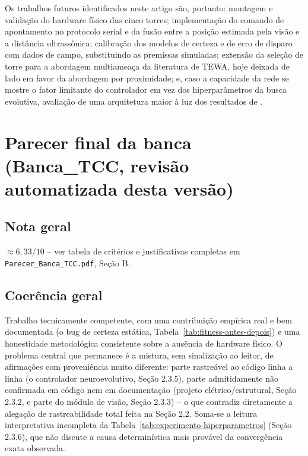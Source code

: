 \documentclass[12pt,a4paper]{article}
\begin{document}
Os trabalhos futuros identificados neste artigo são, portanto: montagem e validação do hardware
físico das cinco torres; implementação do comando de apontamento no protocolo serial e da fusão
entre a posição estimada pela visão e a distância ultrassônica; calibração dos modelos de certeza e
de erro de disparo com dados de campo, substituindo as premissas simuladas; extensão da seleção de
torre para a abordagem multiameaça da literatura de TEWA, hoje deixada de lado em favor da
abordagem por proximidade; e, caso a capacidade da rede se mostre o fator limitante do controlador
em vez dos hiperparâmetros da busca evolutiva, avaliação de uma arquitetura maior à luz dos
resultados de .

\clearpage
\section*{Parecer final da banca (Banca\_TCC, revisão automatizada desta versão)}

\subsection*{Nota geral}

\textbf{$\approx 6{,}33/10$} -- ver tabela de critérios e justificativas completas em
\texttt{Parecer\_Banca\_TCC.pdf}, Seção B.

\subsection*{Coerência geral}

Trabalho tecnicamente competente, com uma contribuição empírica real e bem documentada (o bug de
certeza estática, Tabela~\ref{tab:fitness-antes-depois}) e uma honestidade metodológica consistente
sobre a ausência de hardware físico. O problema central que permanece é a mistura, sem sinalização
ao leitor, de afirmações com proveniência muito diferente: parte rastreável ao código linha a linha
(o controlador neuroevolutivo, Seção 2.3.5), parte admitidamente não confirmada em código nem em
documentação (projeto elétrico/estrutural, Seção 2.3.2, e parte do módulo de visão, Seção 2.3.3) --
o que contradiz diretamente a alegação de rastreabilidade total feita na Seção 2.2. Soma-se a leitura
interpretativa incompleta da Tabela~\ref{tab:experimento-hiperparametros} (Seção 2.3.6), que não
discute a causa determinística mais provável da convergência exata observada.
\end{document}
